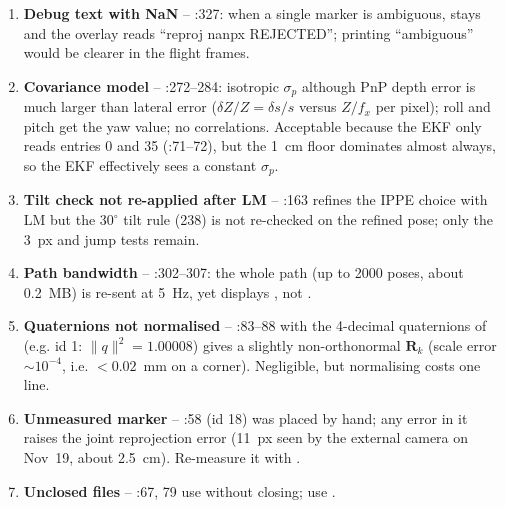 \begin{review}
\begin{enumerate}
  (287) are created on first use and read with ; initialising them in  is clearer.
  The  imports inside  (lines 81, 86) also belong at the top.
\item \textbf{Debug text with NaN} -- :327: when a single marker is ambiguous, 
  stays  and the overlay reads ``reproj nanpx REJECTED''; printing ``ambiguous'' would be clearer in the
  flight frames.
\item \textbf{Covariance model} -- :272--284: isotropic $\sigma_p$ although PnP depth error
  is much larger than lateral error ($\delta Z/Z=\delta s/s$ versus $Z/f_x$ per pixel); roll and pitch get the yaw
  value; no correlations. Acceptable because the EKF only reads entries 0 and 35 (:71--72), but the
  1~cm floor dominates almost always, so the EKF effectively sees a constant $\sigma_p$.
\item \textbf{Tilt check not re-applied after LM} -- :163 refines the IPPE choice with LM
  but the $30^\circ$ tilt rule (238) is not re-checked on the refined pose; only the 3~px and jump tests remain.
\item \textbf{Path bandwidth} -- :302--307: the whole path (up to 2000 poses, about
  0.2~MB) is re-sent at 5~Hz, yet  displays , not .
\item \textbf{Quaternions not normalised} -- :83--88 with the 4-decimal quaternions of
   (e.g. id 1: $\lVert q\rVert^2=1.00008$) gives a slightly non-orthonormal $\mathbf R_k$ (scale
  error $\sim10^{-4}$, i.e. $<0.02$~mm on a corner). Negligible, but normalising costs one line.
\item \textbf{Unmeasured marker} -- :58 (id 18) was placed by hand; any error in it raises the
  joint reprojection error (11~px seen by the external camera on Nov~19, about 2.5~cm).
  Re-measure it with .
\item \textbf{Unclosed files} -- :67, 79 use 
  without closing; use .
\end{enumerate}
\end{review}

